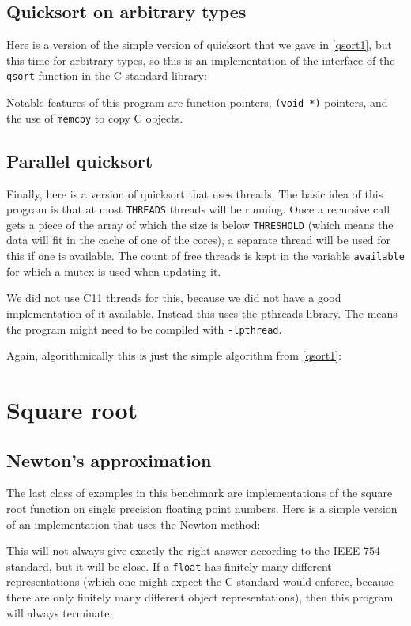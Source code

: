 \documentclass{article}
\begin{document}
\subsection{Quicksort on arbitrary types}
Here is a version of the simple version of quicksort that
we gave in \ref{qsort1}, but this time for arbitrary types, so this is an
implementation of the interface of the \lstinline{qsort} function in the C standard library:

Notable features of this program are function pointers,
\lstinline|(void *)| pointers, and the use of \lstinline|memcpy| to
copy C objects.

\subsection{Parallel quicksort}
Finally, here is a version of quicksort that uses threads.
The basic idea of this program is that at most \lstinline|THREADS| threads will be
running.
Once a recursive call gets a piece of the array of which the size is
below \lstinline|THRESHOLD| (which
means the data will fit in the cache of one of the cores), a separate
thread will be used for this if one is available.
The count of free threads is kept in the variable \lstinline|available|
for which a mutex is used when updating it.

We did not use C11 threads for this, because we did not have a good implementation of it available.
Instead this uses the pthreads library.
The means the program might need to be compiled
with \lstinline{-lpthread}.

Again, algorithmically this is just the simple algorithm from \ref{qsort1}:


\section{Square root}
\subsection{Newton's approximation}
The last class of examples in this benchmark are implementations
of the square root function on single precision floating point numbers.
Here is a simple version of an implementation that uses the Newton method:

This will not always give exactly the right answer according to the IEEE 754
standard, but it will be close.
If a \lstinline|float| has finitely many different representations
(which one might expect the C standard would enforce, because there are only
finitely many different object representations), then this program will
always terminate.
\end{document}
